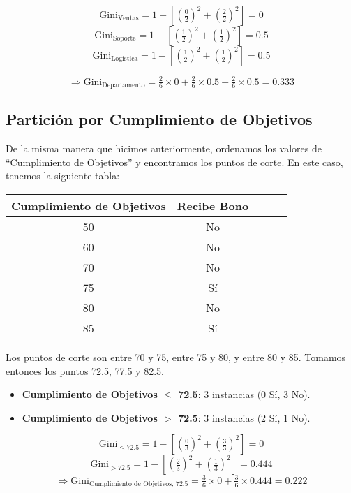 \documentclass[12pt]{article}
\begin{document}
\[
  \mathrm{Gini}_{\text{Ventas}} = 1 - \left[\left(\tfrac{0}{2}\right)^2 + \left(\tfrac{2}{2}\right)^2\right] = 0
\]
\[
  \mathrm{Gini}_{\text{Soporte}} = 1 - \left[\left(\tfrac{1}{2}\right)^2 + \left(\tfrac{1}{2}\right)^2\right] = 0.5
\]
\[
  \mathrm{Gini}_{\text{Logística}} = 1 - \left[\left(\tfrac{1}{2}\right)^2 + \left(\tfrac{1}{2}\right)^2\right] = 0.5
\]

\[
  \Rightarrow \mathrm{Gini}_{\text{Departamento}} = \tfrac{2}{6}\times0 + \tfrac{2}{6}\times0.5 + \tfrac{2}{6}\times0.5 = 0.333
\]
\subsection{Partición por Cumplimiento de Objetivos}

De la misma manera que hicimos anteriormente, ordenamos los valores de ``Cumplimiento de Objetivos'' y encontramos los puntos de corte. En este caso, tenemos la siguiente tabla:
\begin{table}[h]
  \centering
  \begin{tabular}{ccccc}
    \toprule
    Cumplimiento de Objetivos & Recibe Bono \\
    \midrule
    50 & No \\
    60 & No \\
    70 & No \\
    75 & Sí \\
    80 & No \\
    85 & Sí \\
    \bottomrule
  \end{tabular}
\end{table}

Los puntos de corte son entre 70 y 75, entre 75 y 80, y entre 80 y 85. Tomamos entonces los puntos 72.5, 77.5 y 82.5.

\begin{itemize}
  \item \textbf{Cumplimiento de Objetivos $\leq$ 72.5}: 3 instancias (0 Sí, 3 No).
  \item \textbf{Cumplimiento de Objetivos $>$ 72.5}: 3 instancias (2 Sí, 1 No).
\end{itemize}

\[
  \mathrm{Gini}_{\le72.5} = 1 - \left[\left(\tfrac{0}{3}\right)^2 + \left(\tfrac{3}{3}\right)^2\right] = 0
\]
\[
  \mathrm{Gini}_{>72.5} = 1 - \left[\left(\tfrac{2}{3}\right)^2 + \left(\tfrac{1}{3}\right)^2\right] = 0.444
\]
\[
  \Rightarrow \mathrm{Gini}_{\text{Cumplimiento de Objetivos, 72.5}} = \tfrac{3}{6}\times0 + \tfrac{3}{6}\times0.444 = 0.222
\]
\end{document}
